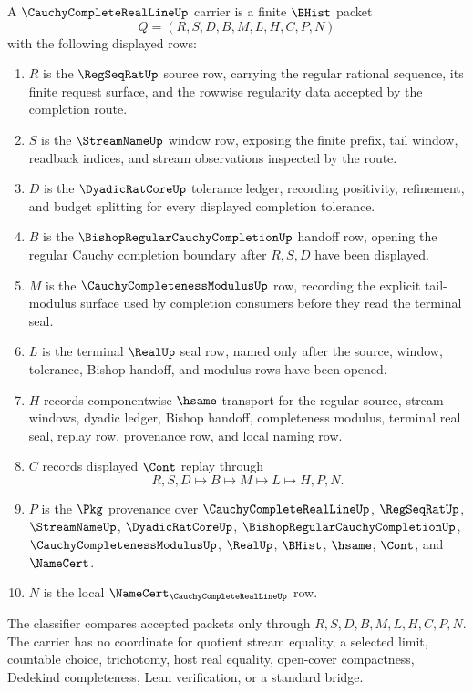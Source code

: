 \begin{definition}
\label{def:cauchy-complete-real-line-carrier}
A $\CauchyCompleteRealLineUp$ carrier is a finite $\BHist$ packet
$$
Q=(R,S,D,B,M,L,H,C,P,N)
$$
with the following displayed rows:
\begin{enumerate}
\item $R$ is the $\RegSeqRatUp$ source row, carrying the regular rational sequence, its finite request surface, and the rowwise regularity data accepted by the completion route.
\item $S$ is the $\StreamNameUp$ window row, exposing the finite prefix, tail window, readback indices, and stream observations inspected by the route.
\item $D$ is the $\DyadicRatCoreUp$ tolerance ledger, recording positivity, refinement, and budget splitting for every displayed completion tolerance.
\item $B$ is the $\BishopRegularCauchyCompletionUp$ handoff row, opening the regular Cauchy completion boundary after $R,S,D$ have been displayed.
\item $M$ is the $\CauchyCompletenessModulusUp$ row, recording the explicit tail-modulus surface used by completion consumers before they read the terminal seal.
\item $L$ is the terminal $\RealUp$ seal row, named only after the source, window, tolerance, Bishop handoff, and modulus rows have been opened.
\item $H$ records componentwise $\hsame$ transport for the regular source, stream windows, dyadic ledger, Bishop handoff, completeness modulus, terminal real seal, replay row, provenance row, and local naming row.
\item $C$ records displayed $\Cont$ replay through
$$
R,S,D \longmapsto B \longmapsto M \longmapsto L \longmapsto H,P,N .
$$
\item $P$ is the $\Pkg$ provenance over $\CauchyCompleteRealLineUp$, $\RegSeqRatUp$, $\StreamNameUp$, $\DyadicRatCoreUp$, $\BishopRegularCauchyCompletionUp$, $\CauchyCompletenessModulusUp$, $\RealUp$, $\BHist$, $\hsame$, $\Cont$, and $\NameCert$.
\item $N$ is the local $\NameCert_{\CauchyCompleteRealLineUp}$ row.
\end{enumerate}
The classifier compares accepted packets only through $R,S,D,B,M,L,H,C,P,N$. The carrier has no coordinate for quotient stream equality, a selected limit, countable choice, trichotomy, host real equality, open-cover compactness, Dedekind completeness, Lean verification, or a standard bridge.
\end{definition}

